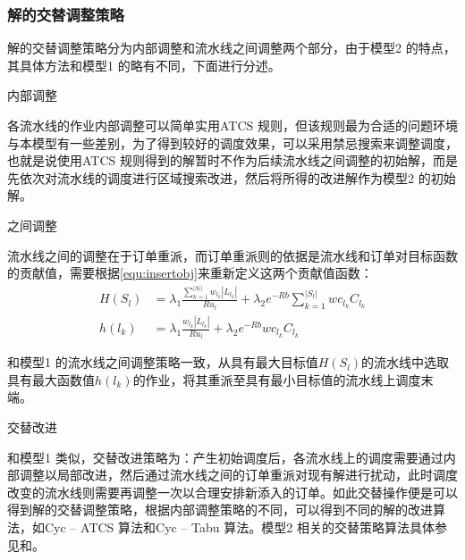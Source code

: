 \subsubsection{解的交替调整策略}
解的交替调整策略分为内部调整和流水线之间调整两个部分，由于模型2 的特点，其具体方法和模型1 的略有不同，下面进行分述。
\begin{asparaenum}
\item 内部调整

各流水线的作业内部调整可以简单实用ATCS 规则，但该规则最为合适的问题环境与本模型有一些差别，为了得到较好的调度效果，可以采用禁忌搜索来调整调度，也就是说使用ATCS 规则得到的解暂时不作为后续流水线之间调整的初始解，而是先依次对流水线的调度进行区域搜索改进，然后将所得的改进解作为模型2 的初始解。

\item 之间调整

流水线之间的调整在于订单重派，而订单重派则的依据是流水线和订单对目标函数的贡献值，需要根据\eqref{equ:insertobj}来重新定义这两个贡献值函数：
\begin{align}
H(S_l) &= \lambda_1\frac{\sum_{k=1}^{|S_l|}w_{l_k}|L_{l_k}|}{Ru_l} + \lambda_2 e^{-Rb}\sum_{k=1}^{|S_l|}wc_{l_k}C_{l_k}\label{equ:lineinsertfunct}\\
h(l_k) &= \lambda_1\frac{w_{l_k}|L_{l_k}|}{Ru_l} + \lambda_2 e^{-Rb}wc_{l_k}C_{l_k}
\label{equ:iteminsertfunct}
\end{align}

和模型1 的流水线之间调整策略一致，从具有最大目标值$H(S_l)$的流水线中选取具有最大函数值$h(l_k)$的作业，将其重派至具有最小目标值的流水线上调度末端。
\item 交替改进
\end{asparaenum}

和模型1 类似，交替改进策略为：产生初始调度后，各流水线上的调度需要通过内部调整以局部改进，然后通过流水线之间的订单重派对现有解进行扰动，此时调度改变的流水线则需要再调整一次以合理安排新添入的订单。如此交替操作便是可以得到解的交替调整策略，根据内部调整策略的不同，可以得到不同的解的改进算法，如Cyc -- ATCS 算法和Cyc -- Tabu 算法。模型2 相关的交替策略算法具体参见和。

